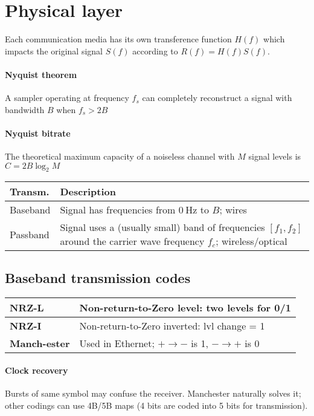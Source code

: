 \documentclass{form}
\begin{document}
\begin{minipage}[c]{0.46\textwidth}
    \section*{Physical layer}

    Each communication media has its own transference function $H(f)$ which impacts the original signal $S(f)$ according to $R(f)=H(f) S(f)$.

    \paragraph{Nyquist theorem}
    A sampler operating at frequency $f_s$ can completely reconstruct a signal with bandwidth $B$ when
    $f_s > 2B$

    \paragraph{Nyquist bitrate}
    The theoretical maximum capacity of a noiseless channel with $M$ signal levels is $C = 2 B \log_2{M}$

    \begin{tabular}{@{}p{4.1em} | p{23.6em}@{}}
        \textbf{Transm.} & \textbf{Description} \\ \hline
        Baseband & Signal has frequencies from $\SI{0}{\hertz}$ to $B$; wires \\ \hline
        Passband & Signal uses a (usually small) band of frequencies $[f_1,f_2]$ around the carrier wave frequency $f_c$; wireless/optical
    \end{tabular}

    \subsection*{Baseband transmission codes}
    \begin{tabular}{@{}p{3.6em} | p{19.4em}@{}}
        \textbf{NRZ-L} & Non-return-to-Zero level: two levels for 0/1 \\ \hline
        \textbf{NRZ-I} & Non-return-to-Zero inverted: lvl change = 1 \\ \hline
        \textbf{Manch-ester} & Used in Ethernet; $+\rightarrow-$ is 1, $-\rightarrow+$ is 0
    \end{tabular}

    \paragraph{Clock recovery}
    Bursts of same symbol may confuse the receiver. Manchester naturally solves it; other codings can use 4B/5B maps (4 bits are coded into 5 bits for transmission).

\end{minipage}
\end{document}
